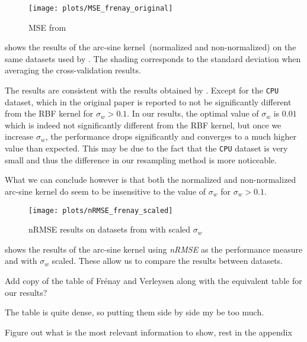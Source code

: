 \begin{figure}[H]
    \texttt{[image: plots/MSE\_frenay\_original]}
    \caption{MSE from \cite{frenayParameterinsensitiveKernelExtreme2011}}
    \label{fig:mse-frenay-original}
\end{figure}

 shows the results of the arc-sine
kernel~(normalized and non-normalized) on the same datasets used by \textcite{frenayParameterinsensitiveKernelExtreme2011}. The shading corresponds to the standard deviation when averaging the
cross-validation results.

The results are consistent with the results obtained by \citeauthor{frenayParameterinsensitiveKernelExtreme2011}.
Except for the \texttt{CPU} dataset, which in the original paper is reported to
not be significantly different from the RBF kernel for $\sigma_w > 0.1$. In
our results, the optimal value of $\sigma_w$ is $0.01$ which is indeed not
significantly different from the RBF kernel, but once we increase $\sigma_w$,
the performance drops significantly and converges to a much higher value than
expected. This may be due to the fact that the \texttt{CPU} dataset is very
small and thus the difference in our resampling method is more noticeable.

What we can conclude however is that both the normalized and non-normalized
arc-sine kernel do seem to be insensitive to the value of $\sigma_w$ for
$\sigma_w > 0.1$.

\begin{figure}[H]
    \texttt{[image: plots/nRMSE\_frenay\_scaled]}
    \caption{nRMSE results on datasets from \cite{frenayParameterinsensitiveKernelExtreme2011} with
        scaled $\sigma_w$}%
    \label{fig:nrmse-frenay-scaled}
\end{figure}

 shows the results of the arc-sine kernel using
\emph{nRMSE} as the performance measure and with $\sigma_w$ scaled. These allow
us to compare the results between datasets.

\begin{cnote}
    Add copy of the table of Frénay and Verleysen along with the equivalent
    table for our results?

    The table is quite dense, so putting them side by side my be too much.

    Figure out what is the most relevant information to show, rest in the
    appendix
\end{cnote}

